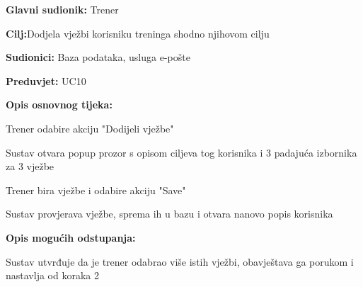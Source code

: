 			   		
			   		\begin{packed_item}
			   			
			   			\item \textbf{Glavni sudionik: }Trener
			   			\item  \textbf{Cilj:}Dodjela vježbi korisniku treninga shodno njihovom cilju
			   			\item  \textbf{Sudionici:} Baza podataka, usluga e-pošte
			   			\item  \textbf{Preduvjet:} UC10
			   			\item  \textbf{Opis osnovnog tijeka:}
			   			
			   			\item[] \begin{packed_enum}
			   				
			   				\item Trener odabire akciju "Dodijeli vježbe"
			   				\item Sustav otvara popup prozor s opisom ciljeva tog korisnika i 3 padajuća izbornika za 3 vježbe
			   				\item Trener bira vježbe i odabire akciju "Save"
			   				\item Sustav provjerava vježbe, sprema ih u bazu i otvara nanovo popis korisnika
			   				
			   				
			   			\end{packed_enum}
			   			
			   			\item  \textbf{Opis mogućih odstupanja:}
			   			
			   			\begin{packed_enum}
			   				
			   				\item[4.a] Sustav utvrđuje da je trener odabrao više istih vježbi, obavještava ga porukom i nastavlja od koraka 2
			   				
			   			\end{packed_enum}
			   			
			   		\end{packed_item}
		   		
		   			\noindent {}
		   			
